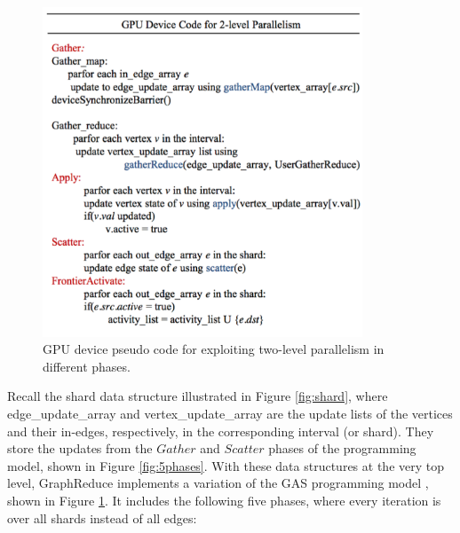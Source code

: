 \begin{figure}[!t]
\centering
\includegraphics[width=0.85\textwidth,height=\textheight,keepaspectratio]{figures/device_code.pdf}
\caption{GPU device pseudo code for exploiting two-level parallelism in different phases. }
\label{fig:pseudo}
\end{figure}



Recall the shard data structure illustrated in Figure \ref{fig:shard}, where edge\_update\_array and vertex\_update\_array are 
the update lists of the vertices and their in-edges, respectively, in the corresponding interval (or shard). 
They store the updates from the $Gather$ and $Scatter$ phases of the programming model, shown in Figure \ref{fig:5phases}. 
With these data structures at the very top level, GraphReduce implements a variation of the GAS programming model \cite{pregel,powergraph,graphlab}, shown 
in Figure \ref{fig:pseudo}. It includes the following five phases, where every iteration is over all shards instead of
all edges:


